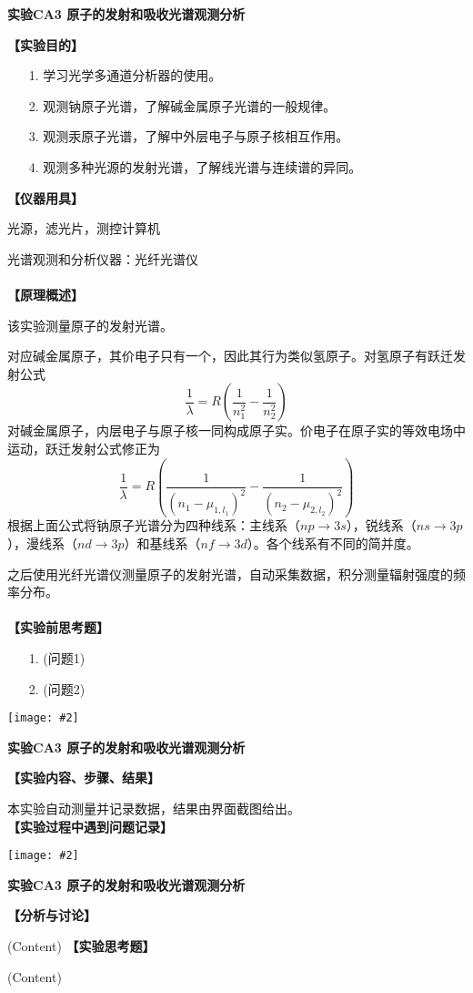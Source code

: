 \documentclass[11pt,a4paper]{ctexart}
\newcommand{\ExpeName}{实验CA3 原子的发射和吸收光谱观测分析}
\newcommand{\cpic}[2]{
\begin{center}
\texttt{[image: \#2]}
\end{center}
}
\newcommand{\beq}{\begin{equation}}
\newcommand{\eeq}{\end{equation}}
\newcommand{\emptyline}{\\ \ \\}
\begin{document}
\newpage%
\begin{center}
\LARGE{\textbf{\ExpeName}}
\end{center}
\textbf{【实验目的】}
\begin{enumerate}
 \item[1.] 学习光学多通道分析器的使用。
 \item[2.] 观测钠原子光谱，了解碱金属原子光谱的一般规律。
 \item[3.] 观测汞原子光谱，了解中外层电子与原子核相互作用。
 \item[4.] 观测多种光源的发射光谱，了解线光谱与连续谱的异同。
\end{enumerate}
\textbf{【仪器用具】}\par
光源，滤光片，测控计算机\par
光谱观测和分析仪器：光纤光谱仪
\emptyline
\textbf{【原理概述】}\par
该实验测量原子的发射光谱。\par
对应碱金属原子，其价电子只有一个，因此其行为类似氢原子。对氢原子有跃迁发射公式
\beq
\frac{1}{\lambda} = R ( \frac{1}{n_1^2} - \frac{1}{n_2^2})
\eeq
对碱金属原子，内层电子与原子核一同构成原子实。价电子在原子实的等效电场中运动，跃迁发射公式修正为
\beq
\frac{1}{\lambda} = R(\frac{1}{(n_1 - \mu_{1,l_1})^2} - \frac{1}{(n_2 - \mu_{2,l_2})^2})
\eeq
根据上面公式将钠原子光谱分为四种线系：主线系（$np \to 3s$），锐线系（$ns \to 3p$），漫线系（$nd \to 3p$）和基线系（$nf \to 3d$）。各个线系有不同的简并度。
\par
之后使用光纤光谱仪测量原子的发射光谱，自动采集数据，积分测量辐射强度的频率分布。
\emptyline
\textbf{【实验前思考题】}
\begin{enumerate}
 \item[1.] (问题1)
 \item[2.] (问题2)
\end{enumerate}

\newpage%
\cpic{0.255}{e2}%
\begin{center}
\LARGE{\textbf{\ExpeName}}
\end{center}
\textbf{【实验内容、步骤、结果】}
\par
本实验自动测量并记录数据，结果由界面截图给出。
\newline
\textbf{【实验过程中遇到问题记录】}

%

\newpage%
\cpic{0.255}{e3}%
\begin{center}
\LARGE\textbf{{\ExpeName}}
\end{center}
\textbf{【分析与讨论】}\par
(Content)
\newline
\textbf{【实验思考题】}\par
(Content)
\end{document}
